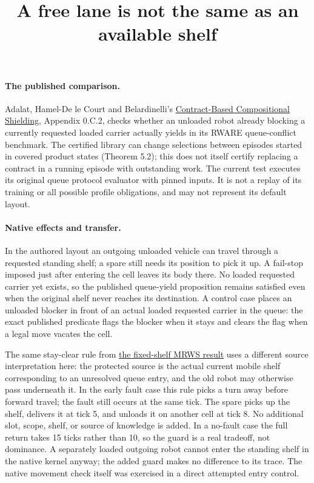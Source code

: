 \documentclass[11pt]{article}
\title{A free lane is not the same as an available shelf}
\date{}
\begin{document}
\maketitle

\paragraph{The published comparison.}
Adalat, Hamel-De le Court and Belardinelli's \href{https://arxiv.org/html/2606.14130v2}{Contract-Based Compositional Shielding}, Appendix 0.C.2, checks whether an unloaded robot already blocking a currently requested loaded carrier actually yields in its RWARE queue-conflict benchmark. The certified library can change selections between episodes started in covered product states (Theorem 5.2); this does not itself certify replacing a contract in a running episode with outstanding work. The current test executes its original queue protocol evaluator with pinned inputs. It is not a replay of its training or all possible profile obligations, and may not represent its default layout.

\paragraph{Native effects and transfer.}
In the authored layout an outgoing unloaded vehicle can travel through a requested standing shelf; a spare still needs its position to pick it up. A fail-stop imposed just after entering the cell leaves its body there. No loaded requested carrier yet exists, so the published queue-yield proposition remains satisfied even when the original shelf never reaches its destination. A control case places an unloaded blocker in front of an actual loaded requested carrier in the queue: the exact published predicate flags the blocker when it stays and clears the flag when a legal move vacates the cell.

The same stay-clear rule from \href{https://github.com/eternal-november/eos-research-programmes/pull/417}{the fixed-shelf MRWS result} uses a different source interpretation here: the protected source is the actual current mobile shelf corresponding to an unresolved queue entry, and the old robot may otherwise pass underneath it. In the early fault case this rule picks a turn away before forward travel; the fault still occurs at the same tick. The spare picks up the shelf, delivers it at tick 5, and unloads it on another cell at tick 8. No additional slot, scope, shelf, or source of knowledge is added. In a no-fault case the full return takes 15 ticks rather than 10, so the guard is a real tradeoff, not dominance. A separately loaded outgoing robot cannot enter the standing shelf in the native kernel anyway; the added guard makes no difference to its trace. The native movement check itself was exercised in a direct attempted entry control.
\end{document}
